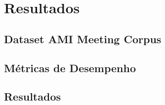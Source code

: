 \chapter{Resultados}

\section{Dataset AMI Meeting Corpus}

\section{Métricas de Desempenho}

\section{Resultados}